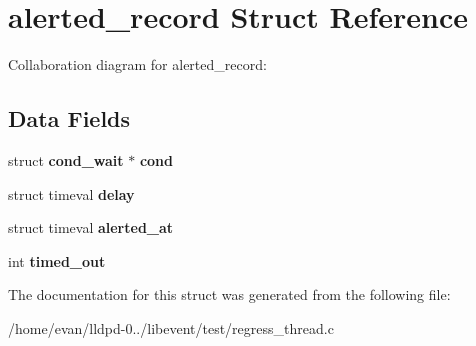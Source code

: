 \section{alerted\-\_\-record \-Struct \-Reference}
\label{structalerted__record}


\-Collaboration diagram for alerted\-\_\-record\-:
\subsection*{\-Data \-Fields}
\begin{DoxyCompactItemize}
\item 
struct {\bf cond\-\_\-wait} $\ast$ {\bfseries cond}\label{structalerted__record_a296475f4dbcf26e9451ec0680de79e3e}

\item 
struct timeval {\bfseries delay}\label{structalerted__record_adbeb449015d3e473ffb595786934c1db}

\item 
struct timeval {\bfseries alerted\-\_\-at}\label{structalerted__record_a6bf9be4a1622d10437ee2fc3769750c2}

\item 
int {\bfseries timed\-\_\-out}\label{structalerted__record_a9c1de9b78f238f9d96931ed05c9cdeeb}

\end{DoxyCompactItemize}


\-The documentation for this struct was generated from the following file\-:\begin{DoxyCompactItemize}
\item 
/home/evan/lldpd-\/0../libevent/test/regress\-\_\-thread.\-c\end{DoxyCompactItemize}
